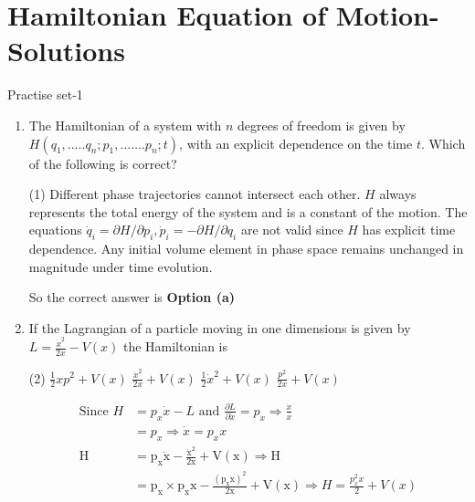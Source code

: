 \chapter{Hamiltonian Equation of Motion-Solutions}
\begin{abox}
	Practise set-1
\end{abox}
\begin{enumerate}
	\item  The Hamiltonian of a system with $n$ degrees of freedom is given by $H\left(q_{1}, \ldots . . q_{n} ; p_{1}, \ldots \ldots . p_{n} ; t\right)$, with an explicit dependence on the time $t$. Which of the following is correct?
	{}
	\begin{tasks}(1)
		\task[\textbf{a.}]Different phase trajectories cannot intersect each other.
		\task[\textbf{b.}]$H$ always represents the total energy of the system and is a constant of the motion.
		\task[\textbf{c.}]The equations $\dot{q}_{i}=\partial H / \partial p_{i}, \dot{p}_{i}=-\partial H / \partial q_{i}$ are not valid since $H$ has explicit time dependence.
		\task[\textbf{d.}]  Any initial volume element in phase space remains unchanged in magnitude under time evolution.
	\end{tasks}
\begin{answer}
	So the correct answer is \textbf{Option (a)}
\end{answer}
	\item  If the Lagrangian of a particle moving in one dimensions is given by $L=\frac{\dot{x}^{2}}{2 x}-V(x)$ the Hamiltonian is
	{}
	\begin{tasks}(2)
		\task[\textbf{a.}]$\frac{1}{2} x p^{2}+V(x)$
		\task[\textbf{b.}]$\frac{\dot{x}^{2}}{2 x}+V(x)$
		\task[\textbf{c.}] $\frac{1}{2} \dot{x}^{2}+V(x)$
		\task[\textbf{d.}] $\frac{p^{2}}{2 x}+V(x)$
	\end{tasks}
\begin{answer}
	\begin{align*}
	\text{Since }H&=p_{x} \dot{x}-L\text{ and }\frac{\partial L}{\partial \dot{x}}=p_{x} \Rightarrow \frac{\dot{x}}{x}\\&=p_{x} \Rightarrow \dot{x}=p_{x} x\\
	\mathrm{H}&=\mathrm{p}_{\mathrm{x}} \dot{\mathrm{x}}-\frac{\dot{\mathrm{x}}^{2}}{2 \mathrm{x}}+\mathrm{V}(\mathrm{x}) \Rightarrow \mathrm{H}\\&=\mathrm{p}_{\mathrm{x}} \times \mathrm{p}_{\mathrm{x}} \mathrm{x}-\frac{\left(\mathrm{p}_{\mathrm{x}} \mathrm{x}\right)^{2}}{2 \mathrm{x}}+\mathrm{V}(\mathrm{x}) \Rightarrow H=\frac{p_{x}^{2} x}{2}+V(x)

\end{align*}
\end{answer}
\end{enumerate}
